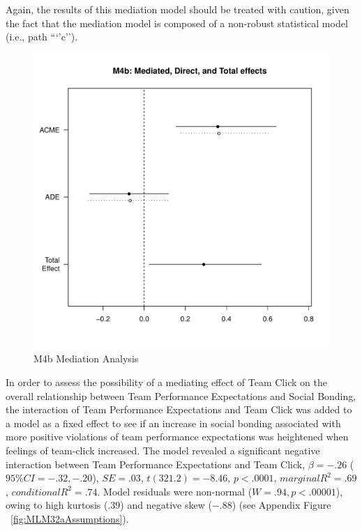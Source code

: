 \begin{CJK}{UTF8}{gbsn}
  Again, the results of this mediation model should be treated with caution, given the fact that the mediation model is composed of a non-robust statistical model (i.e., path ```'c'').

  \begin{figure}[htbp]
    \centering
    \includegraphics[scale = .5]{images/MLM4bMediationEffects.pdf}
    \caption{M4b Mediation Analysis}
    \label{fig:MLM4bMediationAnalysis}
  \end{figure}




In order to assess the possibility of a mediating effect of Team Click on the overall relationship between Team Performance Expectations and Social Bonding, the interaction of Team Performance Expectations and Team Click was added to a model as a fixed effect to see if an increase in social bonding associated with more positive violations of team performance expectations was heightened when feelings of team-click increased. The model revealed a significant negative interaction between Team Performance Expectations and Team Click,  $\beta = -.26$ ($95\% CI =  -.32, -.20$), $SE = .03$, $t(321.2) = -8.46$, $p < .0001$, $marginal R^2 = .69$, $conditional R^2 = .74$.  Model residuals were non-normal ($W = .94, p < .00001$), owing to high kurtosis ($.39$) and negative skew ($-.88$) (see Appendix Figure ~\ref{fig:MLM32aAssumptions}).


\end{CJK}

